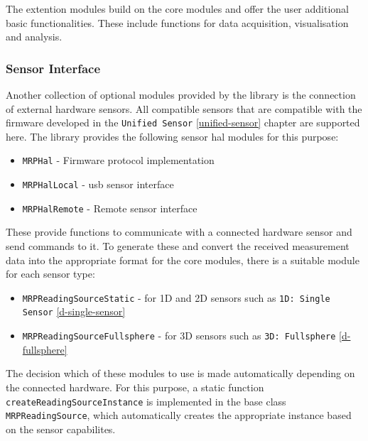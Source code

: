 The extention modules build on the core modules and offer the user
additional basic functionalities. These include functions for data
acquisition, visualisation and analysis.

\hypertarget{sensor-interface}{%
\subsubsection{Sensor Interface}\label{sensor-interface}}

Another collection of optional modules provided by the library is the
connection of external hardware sensors. All compatible sensors that are
compatible with the firmware developed in the
\passthrough{\lstinline!Unified Sensor!} \ref{unified-sensor} chapter
are supported here. The library provides the following sensor \gls{hal}
modules for this purpose:

\begin{itemize}
\tightlist
\item
  \passthrough{\lstinline!MRPHal!} - Firmware protocol implementation
\item
  \passthrough{\lstinline!MRPHalLocal!} - \gls{usb} sensor interface
\item
  \passthrough{\lstinline!MRPHalRemote!} - Remote sensor interface
\end{itemize}

These provide functions to communicate with a connected hardware sensor
and send commands to it. To generate these and convert the received
measurement data into the appropriate format for the core modules, there
is a suitable module for each sensor type:

\begin{itemize}
\tightlist
\item
  \passthrough{\lstinline!MRPReadingSourceStatic!} - for 1D and 2D
  sensors such as \passthrough{\lstinline!1D: Single Sensor!}
  \ref{d-single-sensor}
\item
  \passthrough{\lstinline!MRPReadingSourceFullsphere!} - for 3D sensors
  such as \passthrough{\lstinline!3D: Fullsphere!} \ref{d-fullsphere}
\end{itemize}

The decision which of these modules to use is made automatically
depending on the connected hardware. For this purpose, a static function
\passthrough{\lstinline!createReadingSourceInstance!} is implemented in
the base class \passthrough{\lstinline!MRPReadingSource!}, which
automatically creates the appropriate instance based on the sensor
capabilites.

